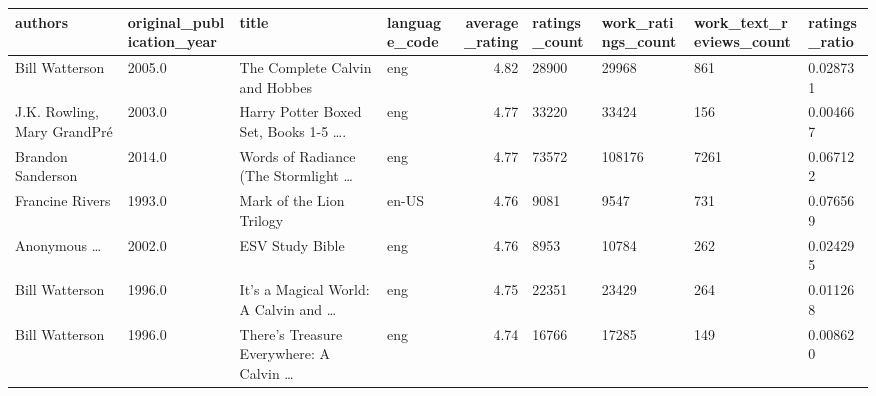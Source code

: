 \documentclass[11pt]{article}
\begin{document}
%
%    

\begin{table}
\begin{tabular}{lHlHrHHHZ}
\toprule
                                    authors &  original\_publication\_year &                                              title & language\_code &  average\_rating &  ratings\_count &  work\_ratings\_count &  work\_text\_reviews\_count &  ratings\_ratio \\
\midrule
                             Bill Watterson &                     2005.0 &                     The Complete Calvin and Hobbes &           eng &            4.82 &          28900 &               29968 &                      861 &       0.028731 \\
                J.K. Rowling, Mary GrandPr\'e &                     2003.0 &  Harry Potter Boxed Set, Books 1-5 \ldots. &           eng &            4.77 &          33220 &               33424 &                      156 &       0.004667 \\
                          Brandon Sanderson &                     2014.0 &     Words of Radiance (The Stormlight \ldots &           eng &            4.77 &          73572 &              108176 &                     7261 &       0.067122 \\
                            Francine Rivers &                     1993.0 &                           Mark of the Lion Trilogy &         en-US &            4.76 &           9081 &                9547 &                      731 &       0.076569 \\
 Anonymous \ldots &                     2002.0 &                                    ESV Study Bible &           eng &            4.76 &           8953 &               10784 &                      262 &       0.024295 \\
                             Bill Watterson &                     1996.0 &  It's a Magical World: A Calvin and \ldots &           eng &            4.75 &          22351 &               23429 &                      264 &       0.011268 \\
                             Bill Watterson &                     1996.0 &  There's Treasure Everywhere: A Calvin \ldots &           eng &            4.74 &          16766 &               17285 &                      149 &       0.008620 \\

\end{tabular}
\end{table}
\end{document}
